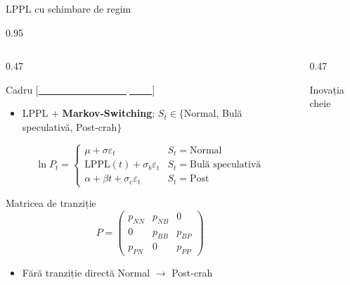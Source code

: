 \documentclass[9pt, aspectratio=169, t]{beamer}
\begin{document}
\begin{frame}{LPPL cu schimbare de regim}
    \begin{cminipage}{0.95\textwidth}
    {\scriptsize
    \begin{columns}[T]
        \begin{column}{0.47\textwidth}
            \begin{block}{Cadru {\scriptsize[\href{https://doi.org/10.1016/j.physa.2020.125367}{\textcolor{white}{Ardila-Alvarez et al., 2021}}]}}
                \begin{itemize}\setlength{\itemsep}{0pt}
                    \item LPPL + \textbf{Markov-Switching}; $S_t \in \{$Normal, Bulă speculativă, Post-crah$\}$
                \end{itemize}
                \vspace{-2mm}
                $$\ln P_t = \begin{cases}
                    \mu + \sigma\varepsilon_t & S_t = \text{Normal} \\
                    \text{LPPL}(t) + \sigma_b\varepsilon_t & S_t = \text{Bulă speculativă} \\
                    \alpha + \beta t + \sigma_c\varepsilon_t & S_t = \text{Post}
                \end{cases}$$
            \end{block}
            \vspace{-2mm}
            \begin{exampleblock}{Matricea de tranziție}
                \vspace{-2mm}
                $$P = \begin{pmatrix}
                    p_{NN} & p_{NB} & 0 \\
                    0 & p_{BB} & p_{BP} \\
                    p_{PN} & 0 & p_{PP}
                \end{pmatrix}$$
                \vspace{-4mm}
                \begin{itemize}\setlength{\itemsep}{0pt}
                    \item Fără tranziție directă Normal $\to$ Post-crah
                \end{itemize}
            \end{exampleblock}
        \end{column}
        \begin{column}{0.47\textwidth}
            \begin{exampleblock}{Inovația cheie}

\end{exampleblock}
\end{column}
\end{columns}}
\end{cminipage}
\end{frame}
\end{document}
